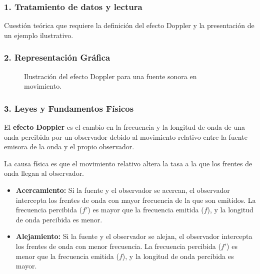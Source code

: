 \subsubsection*{1. Tratamiento de datos y lectura}
Cuestión teórica que requiere la definición del efecto Doppler y la presentación de un ejemplo ilustrativo.

\subsubsection*{2. Representación Gráfica}
\begin{figure}[H]
    \centering
    \caption{Ilustración del efecto Doppler para una fuente sonora en movimiento.}
\end{figure}

\subsubsection*{3. Leyes y Fundamentos Físicos}
El \textbf{efecto Doppler} es el cambio en la frecuencia y la longitud de onda de una onda percibida por un observador debido al movimiento relativo entre la fuente emisora de la onda y el propio observador.

La causa física es que el movimiento relativo altera la tasa a la que los frentes de onda llegan al observador.
\begin{itemize}
    \item \textbf{Acercamiento:} Si la fuente y el observador se acercan, el observador intercepta los frentes de onda con mayor frecuencia de la que son emitidos. La frecuencia percibida ($f'$) es mayor que la frecuencia emitida ($f$), y la longitud de onda percibida es menor.
    \item \textbf{Alejamiento:} Si la fuente y el observador se alejan, el observador intercepta los frentes de onda con menor frecuencia. La frecuencia percibida ($f'$) es menor que la frecuencia emitida ($f$), y la longitud de onda percibida es mayor.
\end{itemize}

